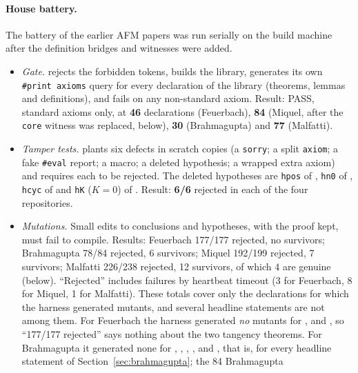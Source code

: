 \documentclass[11pt]{article}
\theoremstyle{definition}
\theoremstyle{remark}
\newcommand{\lean}[1]{\texttt{#1}}
\begin{document}
\paragraph{House battery.} The battery of the earlier AFM papers was run serially on the build
machine after the definition bridges and witnesses were added.
\begin{itemize}
\item \emph{Gate.}  rejects the forbidden tokens, builds the library, generates its
own \lean{\#print axioms} query for every declaration of the library (theorems, lemmas and
definitions), and fails on any non-standard axiom.
Result: PASS, standard axioms only, at \textbf{46} declarations (Feuerbach), \textbf{84} (Miquel,
after the \lean{core} witness was replaced, below), \textbf{30} (Brahmagupta) and \textbf{77}
(Malfatti).
\item \emph{Tamper tests.}  plants six defects in scratch copies (a
\lean{sorry}; a split \lean{axiom}; a fake \lean{\#eval} report; a macro; a deleted hypothesis; a
wrapped extra axiom) and requires each to be rejected. The deleted hypotheses are \lean{hpos} of
, \lean{hn0} of , \lean{hcyc} of
 and \lean{hK} ($K=0$) of .
Result: \textbf{6/6} rejected in each of the four repositories.
\item \emph{Mutations.} Small edits to conclusions and hypotheses, with the proof kept, must fail
to compile. Results: Feuerbach 177/177 rejected, no survivors; Brahmagupta 78/84 rejected,
6 survivors; Miquel 192/199 rejected, 7 survivors; Malfatti 226/238 rejected, 12 survivors, of
which 4 are genuine (below). ``Rejected'' includes failures by heartbeat timeout (3 for Feuerbach,
8 for Miquel, 1 for Malfatti). These totals cover only the declarations for which the harness
generated mutants, and several headline statements are not among them. For Feuerbach the harness
generated \emph{no} mutants for ,
 and ,
so ``177/177 rejected'' says nothing about the two tangency theorems. For Brahmagupta it generated
none for , ,
, ,
 and ,
that is, for every headline statement of Section~\ref{sec:brahmagupta}; the 84 Brahmagupta

\end{itemize}
\end{document}
